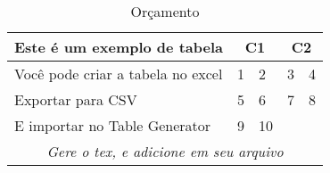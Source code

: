\begin{table}[h!] %
\centering
\caption{Orçamento}
\label{tab2} %
\begin{tabular}{|l|l|l|l|l|}
\hline
\multicolumn{1}{|c|}{\textbf{Este é um exemplo de tabela}} & \multicolumn{2}{c|}{\textbf{C1}} & \multicolumn{2}{c|}{\textbf{C2}} \\ \hline
Você pode criar a tabela no excel                          & 1              & 2               & 3               & 4              \\ \hline
Exportar para CSV                                          & 5              & 6               & 7               & 8              \\ \hline
E importar no Table Generator                              & 9              & 10              &                 &                \\ \hline
\multicolumn{5}{|c|}{\textit{Gere o tex, e adicione em seu arquivo}}                                                             \\ \hline
\end{tabular}
\end{table}